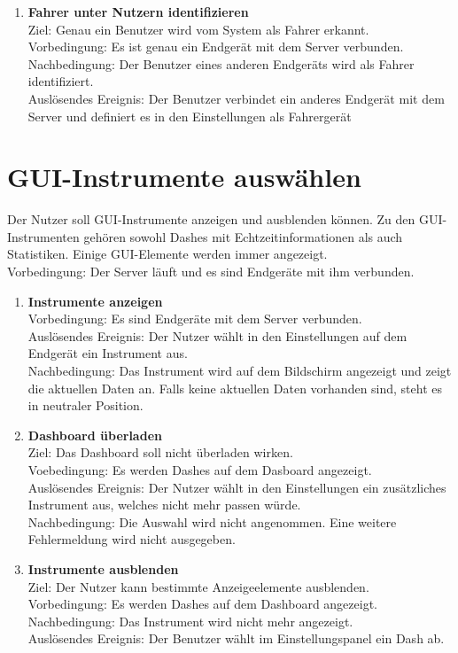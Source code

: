 \documentclass[pflichtenheft.tex]{subfiles}
\begin{document}
\begin{enumerate}
		\item{\textbf{Fahrer unter Nutzern identifizieren}} \label{driver2}
		\\ Ziel: Genau ein Benutzer wird vom System als Fahrer erkannt.  \\
		Vorbedingung: Es ist genau ein Endgerät mit dem Server verbunden.\\
		Nachbedingung: Der Benutzer eines anderen Endgeräts wird als Fahrer identifiziert. \\
		Auslösendes Ereignis: Der Benutzer verbindet ein anderes Endgerät mit dem Server und definiert es in den Einstellungen als Fahrergerät

		\setcounter{enumTemp}{\value{enumi}}
		

	\end{enumerate}
	
	\section{GUI-Instrumente auswählen}
	Der Nutzer soll GUI-Instrumente anzeigen und ausblenden können. Zu den GUI-Instrumenten gehören sowohl Dashes mit Echtzeitinformationen als auch Statistiken. Einige GUI-Elemente werden immer angezeigt.\\
	Vorbedingung: Der Server läuft und es sind Endgeräte mit ihm verbunden.
	
	\begin{enumerate}
	\setcounter{enumi}{\value{enumTemp}}
		\item{\textbf{Instrumente anzeigen}} \\Vorbedingung: Es sind Endgeräte mit dem Server verbunden.\\ Auslösendes Ereignis: Der Nutzer wählt in den Einstellungen auf dem Endgerät ein Instrument aus.\\ Nachbedingung: Das Instrument wird auf dem Bildschirm angezeigt und zeigt die aktuellen Daten an. Falls keine aktuellen Daten vorhanden sind, steht es in neutraler Position.
		\item{\textbf{Dashboard überladen}} \\Ziel: Das Dashboard soll nicht überladen wirken. \\ Voebedingung: Es werden Dashes auf dem Dasboard angezeigt. \\Auslösendes Ereignis: Der Nutzer wählt in den Einstellungen ein zusätzliches Instrument aus, welches nicht mehr passen würde.\\
		Nachbedingung: Die Auswahl wird nicht angenommen. Eine weitere Fehlermeldung wird nicht ausgegeben.
		\item{\textbf{Instrumente ausblenden}} \\
		Ziel: Der Nutzer kann bestimmte Anzeigeelemente ausblenden.\\
		Vorbedingung: Es werden Dashes auf dem Dashboard angezeigt.\\
		Nachbedingung: Das Instrument wird nicht mehr angezeigt.\\
		Auslösendes Ereignis: Der Benutzer wählt im Einstellungspanel ein Dash ab.
		\setcounter{enumTemp}{\value{enumi}}
	\end{enumerate} 
	
\end{document}
